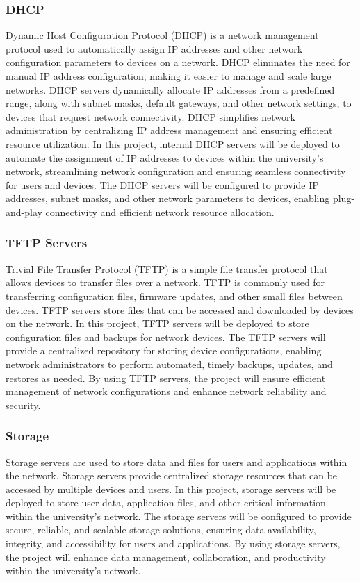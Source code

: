 \documentclass[12pt]{report}
\begin{document}
\subsubsection{DHCP}
Dynamic Host Configuration Protocol (DHCP) is a network management protocol used to automatically assign IP addresses and other network configuration parameters to devices on a network. DHCP eliminates the need for manual IP address configuration, making it easier to manage and scale large networks. DHCP servers dynamically allocate IP addresses from a predefined range, along with subnet masks, default gateways, and other network settings, to devices that request network connectivity. DHCP simplifies network administration by centralizing IP address management and ensuring efficient resource utilization. In this project, internal DHCP servers will be deployed to automate the assignment of IP addresses to devices within the university's network, streamlining network configuration and ensuring seamless connectivity for users and devices. The DHCP servers will be configured to provide IP addresses, subnet masks, and other network parameters to devices, enabling plug-and-play connectivity and efficient network resource allocation. %
\subsubsection{TFTP Servers}
Trivial File Transfer Protocol (TFTP) is a simple file transfer protocol that allows devices to transfer files over a network. TFTP is commonly used for transferring configuration files, firmware updates, and other small files between devices. TFTP servers store files that can be accessed and downloaded by devices on the network. In this project, TFTP servers will be deployed to store configuration files and backups for network devices. The TFTP servers will provide a centralized repository for storing device configurations, enabling network administrators to perform automated, timely backups, updates, and restores as needed. By using TFTP servers, the project will ensure efficient management of network configurations and enhance network reliability and security. %
\subsubsection{Storage}
Storage servers are used to store data and files for users and applications within the network. Storage servers provide centralized storage resources that can be accessed by multiple devices and users. In this project, storage servers will be deployed to store user data, application files, and other critical information within the university's network. The storage servers will be configured to provide secure, reliable, and scalable storage solutions, ensuring data availability, integrity, and accessibility for users and applications. By using storage servers, the project will enhance data management, collaboration, and productivity within the university's network. %
\end{document}
